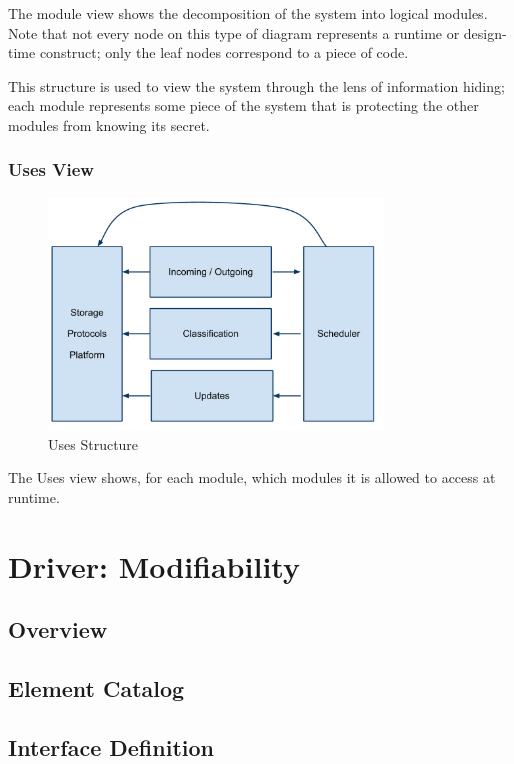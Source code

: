 \documentclass[letterpaper,11pt]{article}
\begin{document}
  The module view shows the decomposition of the system
into logical modules.  Note that not every node on this type of diagram
represents a runtime or design-time construct; only the leaf nodes correspond
to a piece of code.

This structure is used to view the system through the lens of information
hiding; each module represents some piece of the system that is protecting the
other modules from knowing its secret.


\subsubsection{Uses View}
\begin{figure}[h!]
  \centering
  \includegraphics[width=3.5in]{ArchUses.pdf}
  \caption{Uses Structure}
  \label{fig:uses}
\end{figure}

  The Uses view shows, for each module, which modules it
is allowed to access at runtime.


\section{Driver: Modifiability}

\subsection{Overview}

\subsection{Element Catalog}

\subsection{Interface Definition}
\end{document}
